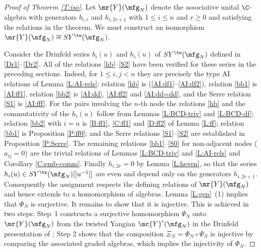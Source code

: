 \documentclass{amsart}
\numberwithin{equation}{section}
\theoremstyle{remark}
\renewcommand{\,}{\kern 0.1em} %
\begin{document}
\begin{proof}[Proof of Theorem \ref{T:iso}]
%
Let $ \mr{Y}(\mfg_N)$ denote the associative unital $\C$-algebra with generators $b_{i,r}$ and $h_{i,2r+1}$ with $1\le i\le n$ and $r\ge 0$ and satisfying the relations in the theorem. We must construct an isomorphism $ \mr{Y}(\mfg_N) \cong SY^{\tw}(\mfg_N)$.

\smallskip

Consider the Drinfeld series $b_i(u)$ and $h_i(u)$ of $SY^{\tw}(\mfg_N)$ defined in \eqref{Dr1}--\eqref{Dr2}. All of the relations \eqref{hb}--\eqref{S2} have been verified for these series in the preceding sections. Indeed, for $1\le i,j<n$ they are precisely the type AI relations of Lemma \ref{L:AI-rels}: relation \eqref{hb} is (\ref{AI:df1}--\ref{AI:df2}), relation \eqref{bb1} is \eqref{AI:ff1}, relation \eqref{bb2} is \eqref{AI:dd}, \eqref{AI:ff2} and \eqref{AI:dd=dd}, and the Serre relation \eqref{S1} is \eqref{AI:fff}. For the pairs involving the $n$-th node the relations \eqref{hb} and the commutativity of the $h_i(u)$ follow from Lemmas \ref{L:BCD-triv} and \ref{L:BCD-df}; relation \eqref{bb2} with $i=n$ is \eqref{B:ff1}, \eqref{C:ff1} and \eqref{D:ff2} of Lemma \ref{L:ff}; relation \eqref{bb1} is Proposition \ref{P:ff0}; and the Serre relations \eqref{S1}--\eqref{S2} are established in Proposition \ref{P:Serre}. The remaining relations \eqref{bb1}--\eqref{S0} for non-adjacent nodes ($a_{ij}=0$) are the trivial relations of Lemmas \ref{L:BCD-triv} and \ref{L:AI-rels} and Corollary \ref{C:emb-comm}. Finally $h_{i,2r}=0$ by Lemma \ref{L:heven}, so that the series $h_i(u) \in SY^{\tw}(\mfg_N)[[u^{-1}]]$ are even and depend only on the generators $h_{i,2r+1}$. Consequently the assignment
%
respects the defining relations of $ \mr{Y}(\mfg_N)$ and hence extends to a homomorphism of algebras. Lemma \ref{L:gen}~(1) implies that $\Phi_N$ is surjective. It remains to show that it is injective. This is achieved in two steps: Step~1 constructs a surjective homomorphism $\Psi_N$ onto $\mr{Y}(\mfg_N)$ from the twisted Yangian $\mc{Y}^{\imath}(\mfg_N)$ in the Drinfeld presentation of \cite{LWZ25b,Lu26a}; Step 2 shows that the composition $\Xi_N = \Phi_N \circ \Psi_N$ is injective by comparing the associated graded algebras, which implies the injectivity of $\Phi_N$.

\smallskip


\end{proof}
\end{document}
